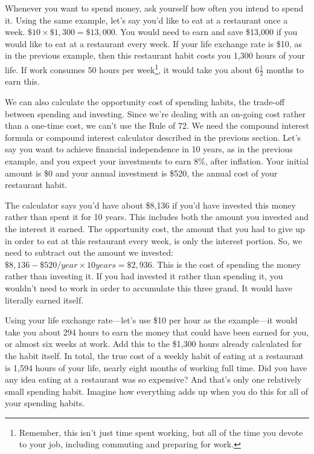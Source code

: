 Whenever you want to spend money, ask yourself how often you intend to spend it. Using the same example, let's say you'd like to eat at a restaurant once a week. $\$10 \times \$1,300 = \$13,000$. You would need to earn and save \$13,000 if you would like to eat at a restaurant every week. If your life exchange rate is \$10, as in the previous example, then this restaurant habit costs you 1,300 hours of your life. If work consumes 50 hours per week\footnote{Remember, this isn't just time spent working, but all of the time you devote to your job, including commuting and preparing for work.}, it would take you about $6\frac{1}{2}$ months to earn this.

We can also calculate the opportunity cost of spending habits, the trade-off between spending and investing. Since we're dealing with an on-going cost rather than a one-time cost, we can't use the Rule of 72. We need the compound interest formula or compound interest calculator described in the previous section. Let's say you want to achieve financial independence in 10 years, as in the previous example, and you expect your investments to earn 8\%, after inflation. Your initial amount is \$0 and your annual investment is \$520, the annual cost of your restaurant habit.

The calculator says you'd have about \$8,136 if you'd have invested this money rather than spent it for 10 years. This includes both the amount you invested and the interest it earned. The opportunity cost, the amount that you had to give up in order to eat at this restaurant every week, is only the interest portion. So, we need to subtract out the amount we invested: $\$8,136 - \$520/year \times 10 years = \$2,936$. This is the cost of spending the money rather than investing it. If you had invested it rather than spending it, you wouldn't need to work in order to accumulate this three grand. It would have literally earned itself.

Using your life exchange rate---let's use \$10 per hour as the example---it would take you about 294 hours to earn the money that could have been earned for you, or almost six weeks at work. Add this to the \$1,300 hours already calculated for the habit itself. In total, the true cost of a weekly habit of eating at a restaurant is 1,594 hours of your life, nearly eight months of working full time. Did you have any idea eating at a restaurant was so expensive? And that's only one relatively small spending habit. Imagine how everything adds up when you do this for all of your spending habits.


